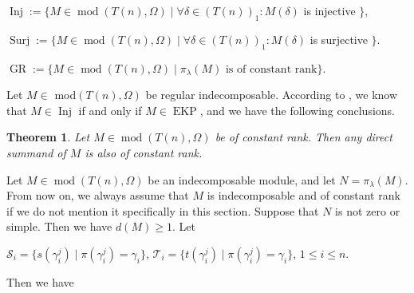 \documentclass[a4paper,12pt]{amsart}
\newcommand{\cT}{\mathcal{T}}
\newcommand{\cS}{\mathcal{S}}
\DeclareMathOperator{\modd}{mod}
\DeclareMathOperator{\Inj}{Inj}
\DeclareMathOperator{\Sur}{Surj}
\DeclareMathOperator{\EKP}{EKP}
\DeclareMathOperator{\GR}{GR}
\newtheorem{Theorem}[proposition]{Theorem}
\begin{document}
\begin{center}
$\Inj := \{M\in\modd(T(n), \Omega)\mid \forall \delta \in (T(n))_1: M(\delta)$ is injective $\}$,

$\Sur:=\{M\in \modd(T(n), \Omega)\mid \forall \delta \in (T(n))_1: M(\delta)$ is surjective $\}.$ 

$\GR:=\{M\in \modd(T(n),\Omega)\mid \pi_\lambda(M)\text{ is of constant rank}\}$.

\end{center}
Let $M\in$ mod$(T(n), \Omega)$ be regular indecomposable. According to \cite[Theorem 8.1]{Daniel}, we know that $M\in\Inj$ if and only if $M\in\EKP $, and we have the following conclusions.





\begin{Theorem} \cite[Theorem 3.7]{Carlson}\label{DS}
 Let $M\in \modd(T(n),\Omega)$ be of constant rank. Then any direct summand of $M$ is also of  constant rank. 

\end{Theorem}























Let $M\in \modd(T(n),\Omega)$ be an indecomposable module, and  let $N=\pi_\lambda(M)$. From now on, we always assume that  $M$  is indecomposable and  of constant rank if we do not mention it specifically in this section. Suppose that $N$ is not zero or simple. Then we have $d(M)\geq 1 $.  Let 
\begin{center}
$\cS_i=\{s(\gamma^j_i)\mid \pi(\gamma^j_i)=\gamma_i \}$, $\cT_i=\{t(\gamma^j_i)\mid \pi(\gamma^j_i)=\gamma_i\}$, $1\leq i\leq n$.

\end{center}

Then we have
\end{document}
